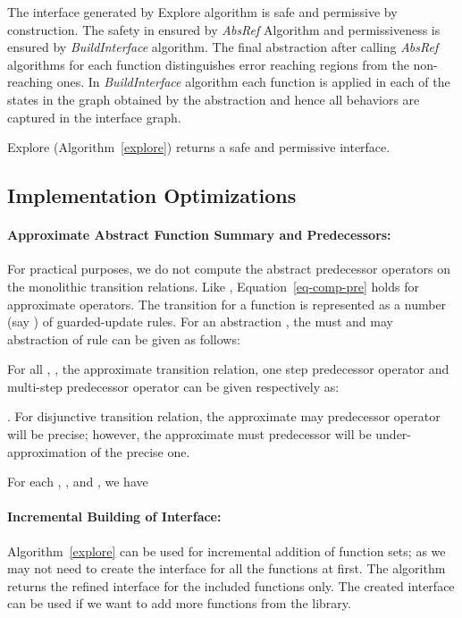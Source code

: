 \documentclass{llncs}
\begin{document}
The interface generated by Explore algorithm is safe and permissive by construction. 
The safety in ensured by {\em AbsRef} Algorithm and permissiveness is ensured by 
{\em BuildInterface} algorithm.
The final abstraction  after calling {\em AbsRef} algorithms for each function  distinguishes
error reaching regions from the non-reaching ones.	
In {\em BuildInterface} algorithm each function  is applied in each of the states in the graph obtained
by the abstraction  and hence all behaviors are captured in the interface graph.
\begin{theorem}
\label{theo-safety-permissive}
Explore (Algorithm~\ref{explore}) returns a safe and permissive interface.
\end{theorem}


\subsection{Implementation Optimizations}

\paragraph{Approximate Abstract Function Summary and Predecessors:} For practical purposes, we do not compute the abstract predecessor operators on the monolithic transition relations.
Like \cite{dAR07concur}, Equation~\ref{eq-comp-pre} holds for approximate operators.
The transition for a function  is represented as a number (say ) of guarded-update rules. 
For an abstraction , the must and may abstraction of rule 
 can be given as follows:

For all , , the approximate transition relation, one step predecessor operator and multi-step predecessor operator
can be given respectively as:

.
For disjunctive transition relation, the approximate may predecessor operator will be precise; however, the approximate must predecessor will be under-approximation of the precise one.
\begin{theorem}
\label{theo-pre-approx}
For each , , and , we have

\end{theorem}

\paragraph{Incremental Building of Interface:} Algorithm~\ref{explore} can be used for incremental addition of function sets;  as we may not need to create the interface for all the functions at first.
The algorithm returns the refined interface for the included functions only.
The created interface can be used if we want to add more functions from the library.
\end{document}
